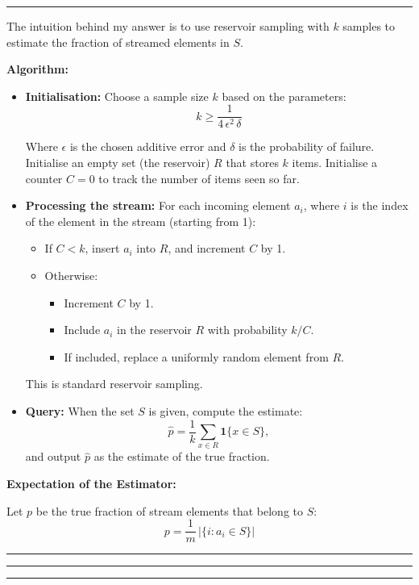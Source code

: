 \documentclass[11pt, english]{article}
\newenvironment{answer}{%
  \par\noindent\hrule %
  \vspace{0.25\baselineskip}%
  \noindent{\Large\bfseries Answer}\par\vspace{0.25\baselineskip}\noindent\ignorespaces
}{%
  \par\vspace{0.5\baselineskip}%
  \noindent\hrule\vspace{0.5\baselineskip}%
  \hrule\hrule
}
\begin{document}
\begin{answer}

The intuition behind my answer is to use reservoir sampling with $k$ samples to estimate the fraction of streamed elements in $S$.

\textbf{Algorithm:}


\begin{itemize}
    \item \textbf{Initialisation:}  
    Choose a sample size $k$ based on the parameters:
    \[
        k \ge \frac{1}{4\,\epsilon^{2}\,\delta}
    \]

    Where $\epsilon$ is the chosen additive error and $\delta$ is the probability of failure.
    Initialise an empty set (the reservoir) $R$ that stores $k$ items.
    Initialise a counter $C = 0$ to track the number of items seen so far.

    \item \textbf{Processing the stream:}  
    For each incoming element $a_i$, where $i$ is the index of the element in the stream (starting from 1):
      \begin{itemize}
        \item If $C < k$, insert $a_i$ into $R$, and increment $C$ by 1.
        \item Otherwise:
          \begin{itemize}
            \item Increment $C$ by 1.
          \item Include $a_i$ in the reservoir $R$ with probability $k/C$.
          \item If included, replace a uniformly random element from $R$.
          \end{itemize}
      \end{itemize}
    This is standard reservoir sampling.

    \item \textbf{Query:}  
    When the set $S$ is given, compute the estimate:
    \[
        \widehat{p} = \frac{1}{k} \sum_{x \in R} \mathbf{1}\{x \in S\},
    \]
    and output $\widehat{p}$ as the estimate of the true fraction.

\end{itemize}

\bigskip

\textbf{Expectation of the Estimator:}

Let $p$ be the true fraction of stream elements that belong to $S$:
\[
    p = \frac{1}{m} \, |\{ i : a_i \in S \}|
\]


\end{answer}
\end{document}
